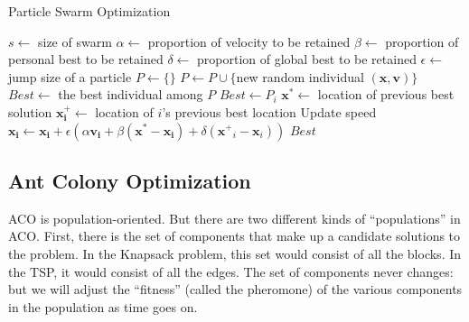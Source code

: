             \begin{algorithm}[!htp]
                \centering
                \caption{Particle Swarm Optimization}
                \begin{algorithmic}[1]
                    \State $s \gets$ size of swarm
                    \State $\alpha \gets$ proportion of velocity to be retained
                    \State $\beta \gets$ proportion of personal best to be retained
                    \State $\delta \gets$ proportion of global best to be retained
                    \State $\epsilon \gets$ jump size of a particle
                    \State $P \gets \{\}$
                        \State $P \gets P \cup \{$new random individual $(\mathbf{x}, \mathbf{v})\}$
                    \EndWhile
                    \State $Best \gets$ the best individual among $P$
                                \State $Best \gets P_i$
                            \EndIf
                        \EndFor
                            \State $\mathbf{x^*} \gets$ location of previous best solution
                            \State $\mathbf{x^+_i} \gets$ location of $i$'s previous best location
                            \State Update speed $\mathbf{x_i} \gets \mathbf{x_i} + \epsilon (\alpha\mathbf{v_i} + \beta(\mathbf{x}^* - \mathbf{x_i}) + \delta(\mathbf{x^+}_i - \mathbf{x}_i))$
                        \EndFor
                    \EndWhile
                    \State \Return $Best$
                \end{algorithmic}
            \end{algorithm}

        \subsection{Ant Colony Optimization}
            ACO is population-oriented. But there are two different kinds of ``populations'' in ACO. First, there is the set of components that make up a candidate solutions to the problem. In the Knapsack problem, this set would consist of all the blocks. In the TSP, it would consist of all the edges. The set of components never changes: but we will adjust the ``fitness'' (called the pheromone) of the various components in the population as time goes on.

